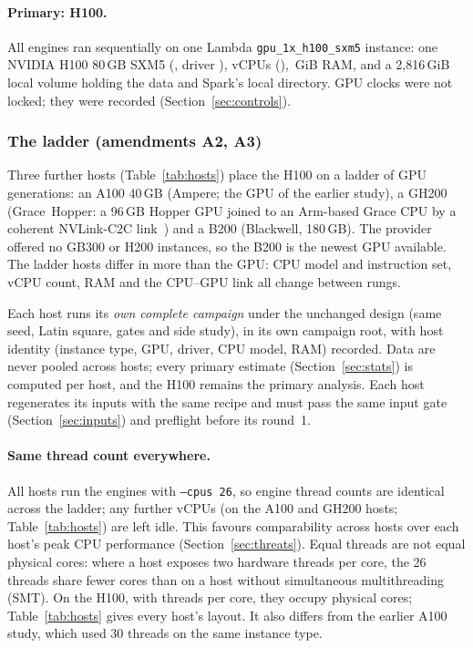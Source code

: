 \documentclass[11pt]{article}
\begin{document}
\paragraph{Primary: H100.} All engines ran sequentially on one Lambda
\texttt{gpu\_1x\_h100\_sxm5} instance: one NVIDIA H100 80\,GB SXM5
(, driver ),  vCPUs
(), \,GiB RAM, and a 2,816\,GiB local volume holding
the data and Spark's local directory. GPU clocks were not locked; they were
recorded (Section~\ref{sec:controls}).

\subsubsection{The ladder (amendments A2, A3)}
\label{sec:ladder-design}
Three further hosts (Table~\ref{tab:hosts}) place the H100 on a ladder of GPU
generations: an A100 40\,GB (Ampere; the GPU of the earlier study), a GH200
(Grace~Hopper: a 96\,GB Hopper GPU joined to an Arm-based Grace CPU by a
coherent NVLink-C2C link~\citep{nvidia_gh200}) and a B200 (Blackwell, 180\,GB). The provider
offered no GB300 or H200 instances, so the B200 is the newest GPU available.
The ladder hosts differ in more than the GPU: CPU model and instruction set,
vCPU count, RAM and the CPU--GPU link all change between rungs.

Each host runs its \emph{own complete campaign} under the unchanged design
(same seed, Latin square, gates and side study), in its own campaign root, with
host identity (instance type, GPU, driver, CPU model, RAM) recorded. Data are
never pooled across hosts; every primary estimate (Section~\ref{sec:stats}) is
computed per host, and the H100 remains the primary analysis. Each host
regenerates its inputs with the same recipe and must pass the same input gate
(Section~\ref{sec:inputs}) and preflight before its round~1.

\paragraph{Same thread count everywhere.} All hosts run the engines with
\texttt{--cpus 26}, so engine thread counts are identical across the ladder;
any further vCPUs (on the A100 and GH200 hosts; Table~\ref{tab:hosts}) are left idle. This favours
comparability across hosts over each host's peak CPU performance
(Section~\ref{sec:threats}). Equal threads are not equal physical cores: where
a host exposes two hardware threads per core, the 26 threads share fewer cores
than on a host without simultaneous multithreading (SMT). On the H100, with
 threads per core, they occupy
 physical cores; Table~\ref{tab:hosts} gives
every host's layout. It also differs from the earlier A100 study,
which used 30 threads on the same instance type.
\end{document}
